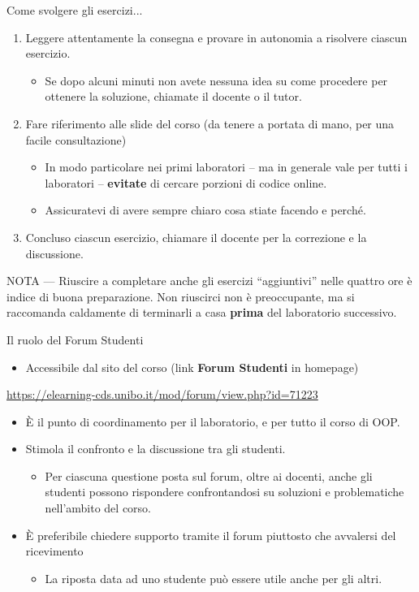 \documentclass[presentation]{beamer}
\begin{document}
\begin{frame}{Come svolgere gli esercizi...}
\begin{enumerate}
\item Leggere attentamente la consegna e provare in autonomia a risolvere ciascun esercizio.
\begin{itemize}
\item Se dopo alcuni minuti non avete nessuna idea su come procedere per ottenere la soluzione, chiamate il docente o il tutor.
\end{itemize}
%
\item Fare riferimento alle slide del corso (da tenere a portata di mano, per una facile consultazione)
\begin{itemize}
\item In modo particolare nei primi laboratori -- ma in generale vale per tutti i laboratori -- \textbf{evitate} di cercare porzioni  di codice online.
\item Assicuratevi di avere sempre chiaro cosa stiate facendo e perché.
\end{itemize}
%
\item Concluso ciascun esercizio, chiamare il docente per la correzione e la discussione.
%
\end{enumerate}
%
NOTA --- Riuscire a completare anche gli esercizi ``aggiuntivi'' nelle quattro ore è indice di buona preparazione. Non riuscirci non è preoccupante, ma si raccomanda caldamente di terminarli a casa \textbf{prima} del laboratorio successivo.
%
\end{frame}

\begin{frame}{Il ruolo del Forum Studenti}
\begin{itemize}
\item Accessibile dal sito del corso (link \textbf{Forum Studenti} in homepage)
\end{itemize}
%
\begin{block}{}
\url{https://elearning-cds.unibo.it/mod/forum/view.php?id=71223}
\end{block}
%
\begin{itemize}\itemsep10pt
\item \`{E} il punto di coordinamento per il laboratorio, e per tutto il corso di OOP.
%
\item Stimola il confronto e la discussione tra gli studenti.
%
\begin{itemize}
\item Per ciascuna questione posta sul forum, oltre ai docenti, anche gli studenti possono rispondere confrontandosi su soluzioni e problematiche nell'ambito del corso.
\end{itemize}
%
\item \`{E} preferibile chiedere supporto tramite il forum piuttosto che avvalersi del ricevimento
\begin{itemize}
\item La riposta data ad uno studente può essere utile anche per gli altri.
\end{itemize}
\end{itemize}
\end{frame}
\end{document}
